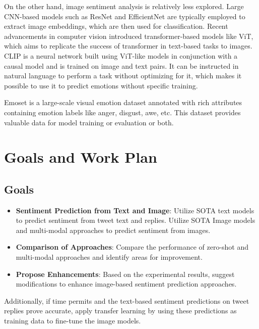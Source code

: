 \documentclass[a4paper]{scrartcl}
\begin{document}
On the other hand, image sentiment analysis is relatively less explored.
Large CNN-based models such as ResNet\cite{he2015deepresiduallearningimage} and EfficientNet\cite{tan2020efficientnetrethinkingmodelscaling} are typically employed to extract image embeddings, which are then used for classification.
Recent advancements in computer vision introduced transformer-based models like ViT\cite{dosovitskiy2021imageworth16x16words}, which aims to replicate the success of transformer in text-based tasks to images.
CLIP\cite{radford2021learningtransferablevisualmodels} is a neural network built using ViT-like models in conjunction with a causal model and is trained on image and text pairs.
It can be instructed in natural language to perform a task without optimizing for it, which makes it possible to use it to predict emotions without specific training.

Emoset\cite{Yang_2023_ICCV} is a large-scale visual emotion dataset annotated with rich attributes containing emotion labels like anger, disgust, awe, etc.
This dataset provides valuable data for model training or evaluation or both.

\section{Goals and Work Plan}\label{sec:goals-and-work-plan}

\subsection{Goals}\label{subsec:goals}
\begin{itemize}
    \item \textbf{Sentiment Prediction from Text and Image}: Utilize SOTA text models to predict sentiment from tweet text and replies.
    Utilize SOTA Image models and multi-modal approaches to predict sentiment from images.
    \item \textbf{Comparison of Approaches}: Compare the performance of zero-shot and multi-modal approaches and identify areas for improvement.
    \item \textbf{Propose Enhancements}: Based on the experimental results, suggest modifications to enhance image-based sentiment prediction approaches.
\end{itemize}
Additionally, if time permits and the text-based sentiment predictions on tweet replies prove accurate, apply transfer learning by using these predictions as training data to fine-tune the image models. 
\end{document}

